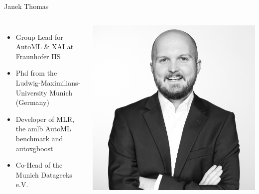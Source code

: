 \begin{frame}[c]{Janek Thomas}

\begin{columns}


	\begin{itemize}
		\item Group Lead for AutoML \& XAI at Fraunhofer IIS
		\item Phd from the Ludwig-Maximilians-University Munich (Germany)
		\item Developer of MLR, the amlb AutoML benchmark and autoxgboost
        \item Co-Head of the Munich Datageeks e.V.
	\end{itemize}


	\includegraphics[width=1\textwidth]{images/janek.jpg}

\end{columns}

\end{frame}
